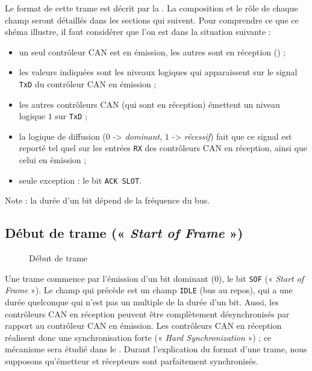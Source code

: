 Le format de cette trame est décrit par la . La composition et le rôle de chaque champ seront détaillés dans les sections qui suivent. Pour comprendre ce que ce shéma illustre, il faut considérer que l'on est dans la situation suivante :
\begin{itemize}
  \item un seul contrôleur CAN est en émission, les autres sont en réception (\pasFini) ;
  \item les valeurs indiquées sont les niveaux logiques qui apparaissent sur le signal \texttt{TxD} du contrôleur CAN en émission ;
  \item les autres contrôleurs CAN (qui sont en réception) émettent un niveau logique $1$ sur \texttt{TxD} ;
  \item la logique de diffusion ($0$ -> \emph{dominant}, $1$ -> \emph{récessif}) fait que ce signal est reporté tel quel sur les entrées \texttt{RX} des contrôleurs CAN en réception, ainsi que celui en émission ;
  \item seule exception : le bit \texttt{ACK SLOT}. 
\end{itemize}

Note : la durée d'un bit dépend de la fréquence du bus.\pasFini









\subsection{Début de trame (« \emph{Start of Frame} »)}

\begin{figure}[h]
  \centering
  \caption{Début de trame}
\end{figure}

Une trame commence par l'émission d'un bit dominant ($0$), le bit \texttt{SOF} (« \emph{Start of Frame} »). Le champ qui précède est un champ \texttt{IDLE} (bus au repos), qui a une durée quelconque qui n'est pas un multiple de la durée d'un bit. Aussi, les contrôleurs CAN en réception peuvent être complètement désynchronisés par rapport au contrôleur CAN en émission. Les contrôleurs CAN en réception réalisent donc une synchronisation forte (« \emph{Hard Synchronization} ») ; ce mécanisme sera étudié dans le . Durant l'explication du format d'une trame, nous supposons qu'émetteur et récepteurs sont parfaitement synchronisés.










